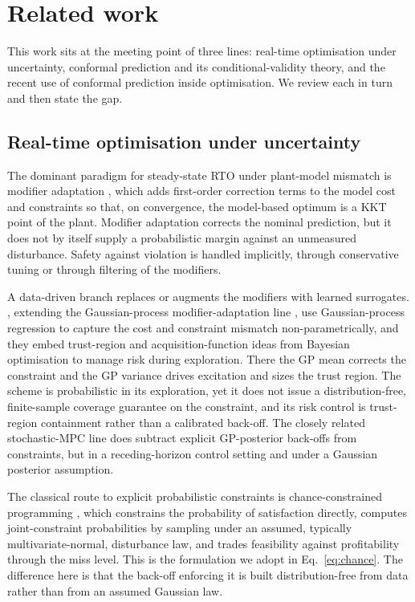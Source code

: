 \section{Related work}
\label{sec:related}

This work sits at the meeting point of three lines: real-time optimisation under
uncertainty, conformal prediction and its conditional-validity theory, and the recent use
of conformal prediction inside optimisation. We review each in turn and then state the gap.

\subsection{Real-time optimisation under uncertainty}

The dominant paradigm for steady-state RTO under plant-model mismatch is modifier adaptation
\citep{marchetti2009,chachuat2009}, which adds first-order correction terms to the model cost
and constraints so that, on convergence, the model-based optimum is a KKT point of the plant.
Modifier adaptation corrects the nominal prediction, but it does not by itself supply a
probabilistic margin against an unmeasured disturbance. Safety against violation is handled
implicitly, through conservative tuning or through filtering of the modifiers.

A data-driven branch replaces or augments the modifiers with learned surrogates.
\citet{delrio2021}, extending the Gaussian-process modifier-adaptation line
\citep{delrio2019}, use Gaussian-process regression to capture the cost and constraint
mismatch non-parametrically, and they embed trust-region and acquisition-function ideas from
Bayesian optimisation to manage risk during exploration. There the GP mean corrects the
constraint and the GP variance drives excitation and sizes the trust region. The scheme is
probabilistic in its exploration, yet it does not issue a distribution-free, finite-sample
coverage guarantee on the constraint, and its risk control is trust-region containment rather
than a calibrated back-off. The closely related stochastic-MPC line
\citep{bradford2019,bradford2020} does subtract explicit GP-posterior back-offs from
constraints, but in a receding-horizon control setting and under a Gaussian posterior
assumption.

The classical route to explicit probabilistic constraints is chance-constrained programming
\citep{li2008}, which constrains the probability of satisfaction directly, computes
joint-constraint probabilities by sampling under an assumed, typically multivariate-normal,
disturbance law, and trades feasibility against profitability through the miss level. This is
the formulation we adopt in Eq.~\eqref{eq:chance}. The difference here is that the back-off
enforcing it is built distribution-free from data rather than from an assumed Gaussian law.

